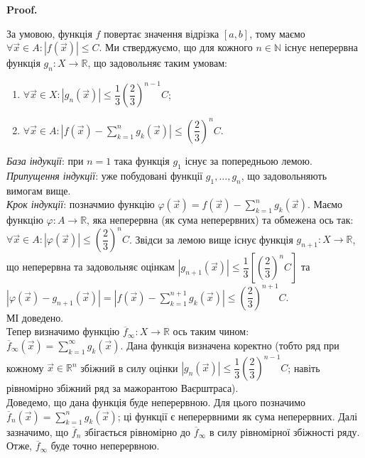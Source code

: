 \documentclass[a4paper, 10pt]{article}
\makeatletter
\def\qed{$\blacksquare$}
\theoremstyle{theoremdd}
\theoremstyle{theoremdd}
\theoremstyle{theoremdd}
\theoremstyle{theoremdd}
\theoremstyle{theoremdd}
\theoremstyle{theoremdd}
\theoremstyle{theoremdd}
\theoremstyle{theoremdd}
\theoremstyle{theoremdd}
\theoremstyle{theoremdd}
\theoremstyle{theoremdd}
\theoremstyle{theoremdd}
\theoremstyle{theoremdd}
\theoremstyle{theoremdd}
\theoremstyle{theoremdd}
\renewenvironment{proof}[1][Proof.\\]{\par
\pushQED{\hfill \qed}%
\normalfont \topsep6\p@\@plus6\p@\relax
\trivlist
\item\relax
{\bfseries
#1\@addpunct{.}}\hspace\labelsep\ignorespaces
}{%
\popQED\endtrivlist\@endpefalse
}
\makeatother
\begin{document}
\begin{proof}
За умовою, функція $f$ повертає значення відрізка $[a,b]$, тому маємо $\forall \vec{x} \in A: |f(\vec{x})| \leq C$. Ми стверджуємо, що для кожного $n \in \mathbb{N}$ існує неперервна функція $g_n \colon X \to \mathbb{R}$, що задовольняє таким умовам:
\begin{enumerate}[nosep,wide=0pt,label={\arabic*)}]
\item $\forall \vec{x} \in X: |g_n(\vec{x})| \leq \dfrac{1}{3} \left( \dfrac{2}{3}\right)^{n-1} C$;
\item $\forall \vec{x} \in A: \displaystyle\left| f(\vec{x}) - \sum_{k=1}^n g_k(\vec{x}) \right| \leq \left( \dfrac{2}{3} \right)^n C$.
\end{enumerate}
\textit{База індукції}: при $n = 1$ така функція $g_1$ існує за попередньою лемою.\\
\textit{Припущення індукції}: уже побудовані функції $g_1,\dots,g_n$, що задовольняють вимогам вище.\\
\textit{Крок індукції}: позначмио функцію $\varphi(\vec{x}) = \displaystyle f(\vec{x}) - \sum_{k=1}^n g_k(\vec{x})$. Маємо функцію $\varphi \colon A \to \mathbb{R}$, яка неперервна (як сума неперервних) та обмежена ось так: $\forall \vec{x} \in A: |\varphi(\vec{x})| \leq \left( \dfrac{2}{3} \right)^n C$. Звідси за лемою вище існує функція $g_{n+1} \colon X \to \mathbb{R}$, що неперервна та задовольняє оцінкам $|g_{n+1}(\vec{x})| \leq \dfrac{1}{3} \left[ \left(\dfrac{2}{3}\right)^n C \right]$ та $|\varphi(\vec{x}) - g_{n+1}(\vec{x})| = \displaystyle\left| f(\vec{x}) - \sum_{k=1}^{n+1} g_k(\vec{x}) \right| \leq \left( \dfrac{2}{3} \right)^{n+1}C$.\\
МІ доведено. \\
Тепер визначимо функцію $\overline{f}_{\infty} \colon X \to \mathbb{R}$ ось таким чином: $\overline{f}_\infty(\vec{x}) = \displaystyle\sum_{k=1}^\infty g_k(\vec{x})$. Дана функція визначена коректно (тобто ряд при кожному $\vec{x} \in \mathbb{R}^n$ збіжний в силу оцінки $|g_n(\vec{x})| \leq \dfrac{1}{3} \left( \dfrac{2}{3}\right)^{n-1}C$; навіть рівномірно збіжний ряд за мажорантою Ваєрштраса). \\
Доведемо, що дана функція буде неперервною. Для цього позначимо $\overline{f}_n(\vec{x}) = \displaystyle\sum_{k=1}^n g_k(\vec{x})$; ці функції є неперервними як сума неперервних. Далі зазначимо, що $\overline{f}_n$ збігається рівномірно до $\overline{f}_\infty$ в силу рівномірної збіжності ряду. Отже, $\overline{f}_\infty$ буде точно неперервною.\\

\end{proof}
\end{document}
